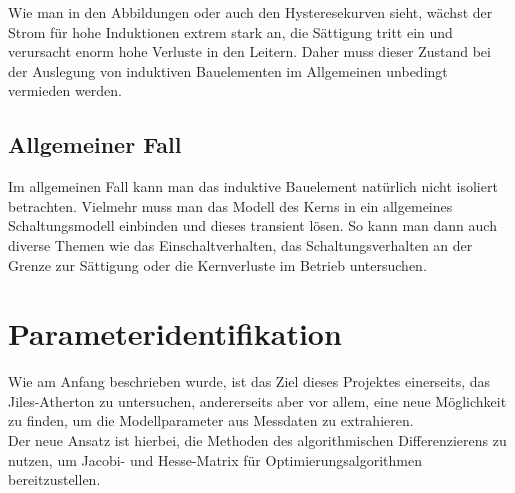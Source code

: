 \documentclass{scrartcl}
\begin{document}
\begin{figure}[h]
\end{figure}
Wie man in den Abbildungen oder auch den Hysteresekurven sieht, wächst der Strom für hohe Induktionen extrem stark an, die Sättigung tritt ein und verursacht enorm hohe Verluste in den Leitern. Daher muss dieser Zustand bei der Auslegung von induktiven Bauelementen im Allgemeinen unbedingt vermieden werden.
\subsection{Allgemeiner Fall}
Im allgemeinen Fall kann man das induktive Bauelement natürlich nicht isoliert betrachten. Vielmehr muss man das Modell des Kerns in ein allgemeines Schaltungsmodell einbinden und dieses transient lösen. So kann man dann auch diverse Themen wie das Einschaltverhalten, das Schaltungsverhalten an der Grenze zur Sättigung oder die Kernverluste im Betrieb untersuchen.
\section{Parameteridentifikation}
Wie am Anfang beschrieben wurde, ist das Ziel dieses Projektes einerseits, das Jiles-Atherton zu untersuchen, andererseits aber vor allem, eine neue Möglichkeit zu finden, um die Modellparameter aus Messdaten zu extrahieren.\\
Der neue Ansatz ist hierbei, die Methoden des algorithmischen Differenzierens zu nutzen, um Jacobi- und Hesse-Matrix für Optimierungsalgorithmen bereitzustellen.
\end{document}
